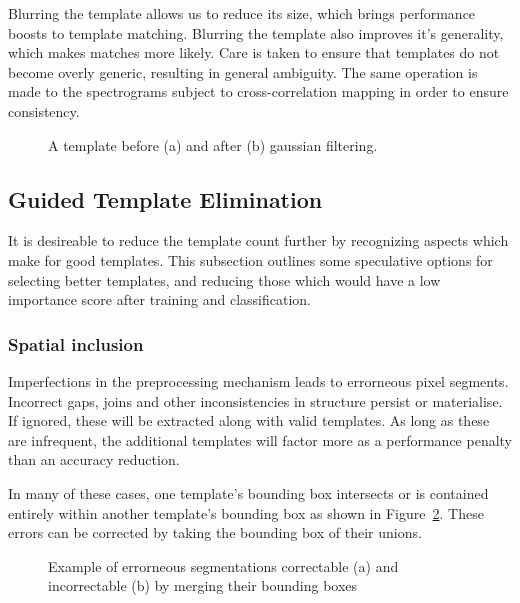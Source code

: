 Blurring the template allows us to reduce its size, which brings performance
boosts to template matching.
Blurring the template also improves it's generality, which makes matches more
likely.
Care is taken to ensure that templates do not become overly generic, resulting
in general ambiguity.
The same operation is made to the spectrograms subject to cross-correlation
mapping in order to ensure consistency.

\begin{figure}[h]
  \centering
  \begin{subfigure}[h]{0.5\textwidth}
    \centering
    \caption{}
  \end{subfigure}
  \begin{subfigure}[h]{0.5\textwidth}
    \centering
    \caption{}
  \end{subfigure}
  \caption{A template before (a) and after (b) gaussian filtering.}
  \label{fig:extract_blur}
\end{figure}

\subsection{Guided Template Elimination}
It is desireable to reduce the template count further by recognizing aspects which
make for good templates. This subsection outlines some speculative options for
selecting better templates, and reducing those which would have a low importance
score after training and classification.

\subsubsection{Spatial inclusion}
Imperfections in the preprocessing mechanism leads to errorneous pixel segments.
Incorrect gaps, joins and other inconsistencies in structure persist or
materialise.
If ignored, these will be extracted along with valid templates.
As long as these are infrequent, the additional templates will factor more as
a performance penalty than an accuracy reduction.

In many of these cases, one template's bounding box intersects or is contained
entirely within another template's bounding box as shown in
Figure~\ref{fig:segment_intersect_a}.
These errors can be corrected by taking the bounding box of their unions.

\begin{figure}[h]
  \centering
  \begin{subfigure}[h]{0.5\textwidth}
    \centering
    \caption{}\label{fig:segment_intersect_a}
  \end{subfigure}
  \begin{subfigure}[h]{0.5\textwidth}
    \centering
    \caption{}
  \end{subfigure}
  \caption{Example of errorneous segmentations correctable (a) and incorrectable (b)
  by merging their bounding boxes}
  \label{fig:segment_intersect}
\end{figure}

